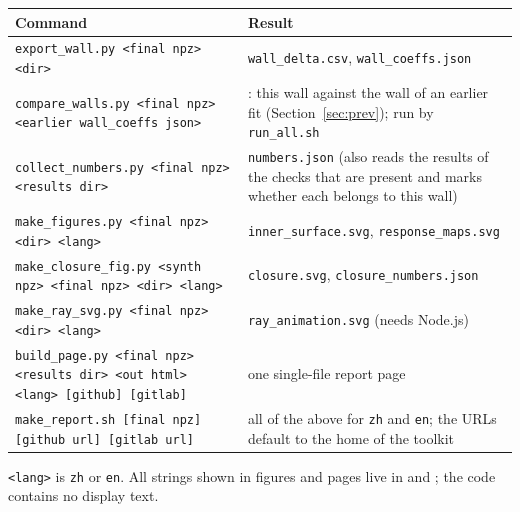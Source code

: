 \documentclass[11pt,a4paper]{article}
\newcommand{\code}[1]{\texttt{#1}}
\begin{document}
\begin{tabularx}{\textwidth}{@{}L{6.6cm}Y@{}}
\toprule
Command & Result \\
\midrule
\code{export\_wall.py <final npz> <dir>} & \code{wall\_delta.csv}, \code{wall\_coeffs.json} \\
\code{compare\_walls.py <final npz> <earlier wall\_coeffs json>} & :
this wall against the wall of an earlier fit (Section~\ref{sec:prev}); run by \code{run\_all.sh} \\
\code{collect\_numbers.py <final npz> <results dir>} & \code{numbers.json} (also reads the results of
the checks that are present and marks whether each belongs to this wall) \\
\code{make\_figures.py <final npz> <dir> <lang>} & \code{inner\_surface.svg}, \code{response\_maps.svg} \\
\code{make\_closure\_fig.py <synth npz> <final npz> <dir> <lang>} & \code{closure.svg},
\code{closure\_numbers.json} \\
\code{make\_ray\_svg.py <final npz> <dir> <lang>} & \code{ray\_animation.svg} (needs Node.js) \\
\code{build\_page.py <final npz> <results dir> <out html> <lang> [github] [gitlab]} & one single-file
report page \\
\code{make\_report.sh [final npz] [github url] [gitlab url]} & all of the above for \code{zh} and
\code{en}; the URLs default to the home of the toolkit \\
\bottomrule
\end{tabularx}

\code{<lang>} is \code{zh} or \code{en}. All strings shown in figures and pages live in
 and ; the code contains no display text.
\end{document}

